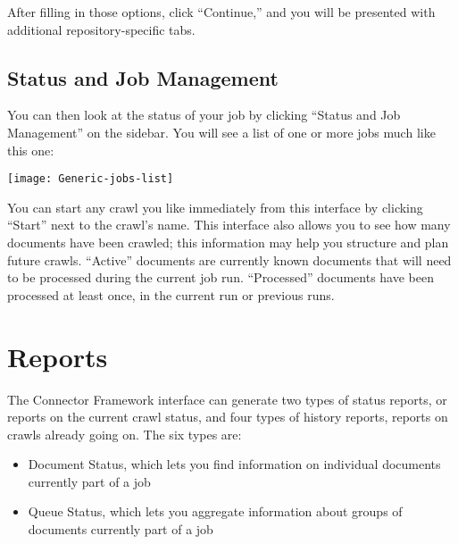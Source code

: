 \begin{changemargin}{1.5in}{0in}
\begin{itemize}
\end{itemize}

After filling in those options, click ``Continue,'' and you will be
presented with additional repository-specific tabs. 











\subsection{Status and Job Management}\label{ManageJobs}

You can then look at the status of your job by clicking ``Status and 
Job Management'' on the sidebar. You will see a list of one or more jobs
much like this one:

\texttt{[image: Generic-jobs-list]}

You can start any crawl you like immediately from this interface by
clicking ``Start'' next to the crawl's name. This interface also allows
you to see how many documents have been crawled; this information may help
you structure and plan future crawls. ``Active'' documents are currently
known documents that will need to be processed during the current job run.
``Processed'' documents have been processed at least once, in the current
run or previous runs.


\section{Reports}

The Connector Framework interface can generate two types of status
reports, or reports on the current crawl status, and four types of
history reports, reports on crawls already going on. The six types are:

\begin{itemize}

\item Document Status, which lets you find information on individual 
documents currently part of a job 

\item Queue Status, which lets you aggregate information about groups
of documents currently part of a job 


\end{itemize}
\end{changemargin}
